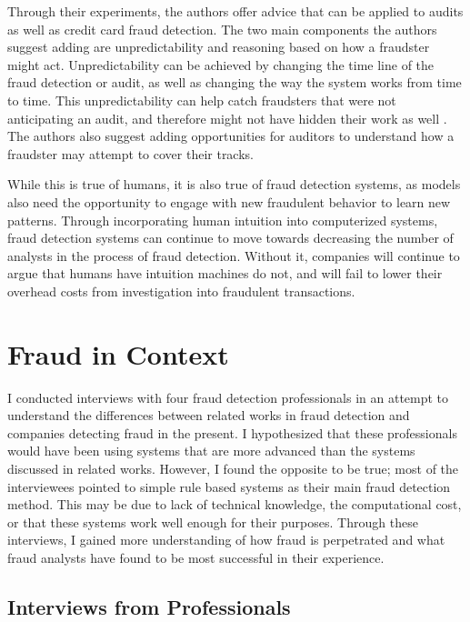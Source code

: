 \documentclass[midd]{thesis}
\begin{document}
Through their experiments, the authors offer advice that can be applied to audits as well as credit card fraud detection. The two main components the authors suggest adding are unpredictability and reasoning based on how a fraudster might act. Unpredictability can be achieved by changing the time line of the fraud detection or audit, as well as changing the way the system works from time to time. This unpredictability can help catch fraudsters that were not anticipating an audit, and therefore might not have hidden their work as well \cite{Wilks2004}. The authors also suggest adding opportunities for auditors to understand how a fraudster may attempt to cover their tracks. 

While this is true of humans, it is also true of fraud detection systems, as models also need the opportunity to engage with new fraudulent behavior to learn new patterns. Through incorporating human intuition into computerized systems, fraud detection systems can continue to move towards decreasing the number of analysts in the process of fraud detection. Without it, companies will continue to argue that humans have intuition machines do not, and will fail to lower their overhead costs from investigation into fraudulent transactions. 




\noindent

\pagebreak
\chapter{Fraud in Context}
\label{sec:context}

I conducted interviews with four fraud detection professionals in an attempt to understand the differences between related works in fraud detection and companies detecting fraud in the present. I hypothesized that these professionals would have been using systems that are more advanced than the systems discussed in related works. However, I found the opposite to be true; most of the interviewees pointed to simple rule based systems as their main fraud detection method. This may be due to lack of technical knowledge, the computational cost, or that these systems work well enough for their purposes. Through these interviews, I gained more understanding of how fraud is perpetrated and what fraud analysts have found to be most successful in their experience. 

\section{Interviews from Professionals}
\end{document}
